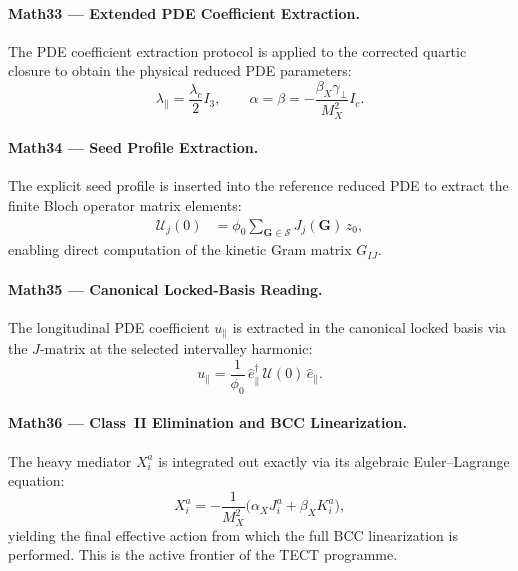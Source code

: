 \documentclass[reprint,aps,pre,onecolumn,superscriptaddress,amsmath,amssymb]{revtex4-2}
\begin{document}
\paragraph{Math33 --- Extended PDE Coefficient Extraction.}
The PDE coefficient extraction protocol is applied to the corrected quartic
closure to obtain the physical reduced PDE parameters:
\begin{equation}
  \lambda_{\parallel} = \frac{\lambda_{c}}{2}I_{3},
  \qquad
  \alpha = \beta = -\frac{\beta_{X}\gamma_{\perp}}{M_{X}^{2}}I_{c}.
  \label{eq:PDE-coeffs}
\end{equation}

\paragraph{Math34 --- Seed Profile Extraction.}
The explicit seed profile is inserted into the reference reduced PDE to extract
the finite Bloch operator matrix elements:
\begin{align}
  \mathcal{U}_{j}(0)
  &=
  \phi_{0}\sum_{\mathbf{G}\in\mathcal{S}} J_{j}(\mathbf{G})\,z_{0},
  \label{eq:seed-extract}
\end{align}
enabling direct computation of the kinetic Gram matrix $G_{IJ}$.

\paragraph{Math35 --- Canonical Locked-Basis Reading.}
The longitudinal PDE coefficient $u_{\parallel}$ is extracted in the canonical
locked basis via the $J$-matrix at the selected intervalley harmonic:
\begin{equation}
  u_{\parallel}
  =
  \frac{1}{\phi_{0}}\,
  \hat{e}_{\parallel}^{\dagger}\,\mathcal{U}(0)\,\hat{e}_{\parallel}.
  \label{eq:u-parallel}
\end{equation}

\paragraph{Math36 --- Class~II Elimination and BCC Linearization.}
The heavy mediator $X_{i}^{a}$ is integrated out exactly via its algebraic
Euler--Lagrange equation:
\begin{equation}
  X_{i}^{a}
  = -\frac{1}{M_{X}^{2}}\bigl(\alpha_{X}J_{i}^{a} + \beta_{X}K_{i}^{a}\bigr),
  \label{eq:X-elim}
\end{equation}
yielding the final effective action from which the full BCC linearization
is performed. This is the active frontier of the TECT programme.
\end{document}
